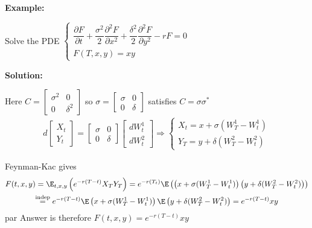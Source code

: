 \par\bigskip
\noindent\textbf{Example:}\par
\noindent Solve the PDE $\begin{cases}
  \dfrac{\partial F}{\partial t}+\dfrac{\sigma^2}{2}\dfrac{\partial^2 F}{\partial x^2}+\dfrac{\delta^2}{2}\dfrac{\partial^2 F}{\partial y^2}-rF = 0\\ F(T,x,y) = xy
\end{cases}$
\par\bigskip
\noindent\textbf{Solution:}\par
\noindent Here $C = \begin{bmatrix}\sigma^2&0\\0&\delta^2\end{bmatrix}$ so $\sigma = \begin{bmatrix}\sigma&0\\0&\delta\end{bmatrix}$ satisfies $C = \sigma\sigma^*$
\begin{equation*}
  \begin{gathered}
    d\begin{bmatrix}X_t\\Y_t\end{bmatrix} = \begin{bmatrix}\sigma&0\\0&\delta\end{bmatrix}\begin{bmatrix}dW_t^1\\dW_t^2\end{bmatrix}\Rightarrow \begin{cases}
    X_t = x+\sigma(W_T^1-W_t^1)\\ Y_T = y+\delta(W_T^2-W_t^2)
  \end{cases}
  \end{gathered}
\end{equation*}\par
\noindent Feynman-Kac gives
\begin{equation*}
  \begin{gathered}
    F(t,x,y) = \E_{t,x,y}\left(e^{-r(T-t)}X_TY_T\right) = e^{-r(T_t)}\E\left(\left(x+\sigma(W_T^1-W_t^1)\right)\left(y+\delta(W_T^2-W_t^2)\right)\right)\\
    \stackrel{\text{indep}}{=} e^{-r(T-t)}\E\left(x+\sigma(W_T^1-W_t^1)\right)\E\left(y+\delta(W_T^2-W_t^2)\right) = e^{-r(T-t)}xy
  \end{gathered}
\end{equation*}par
\noindent Answer is therefore $F(t,x,y) = e^{-r(T-t)}xy$
